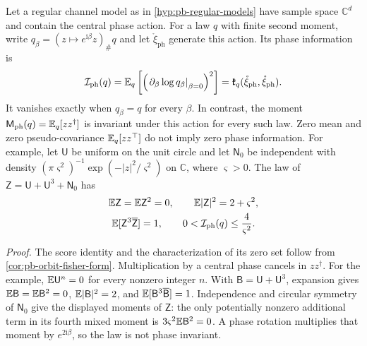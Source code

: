 Let a regular channel model as in \cref{hyp:pb-regular-models} have sample space
$\mathbb C^d$ and contain the central phase action. For a law $q$ with finite second
moment, write $q_\beta=(z\mapsto e^{\mathrm i\beta}z)_\#q$ and let
$\mathring\xi_{\mathrm{ph}}$ generate this action. Its phase information is
\begin{equation}
\mathcal I_{\mathrm{ph}}(q)
=\mathbb E_q\left[\left(\left.\partial_\beta\log q_\beta\right|_{\beta=0}\right)^2\right]
=\mathfrak k_q(\mathring\xi_{\mathrm{ph}},\mathring\xi_{\mathrm{ph}}).
\label{eq:pb-phase-information}
\end{equation}
It vanishes exactly when $q_\beta=q$ for every $\beta$. In contrast, the moment
$\mathsf M_{\mathrm{ph}}(q)=\mathbb E_q[zz^\dagger]$ is invariant under this action for every such law.
Zero mean and zero pseudo-covariance $\mathbb E_q[zz^\top]$ do not imply zero phase
information. For example, let $\mathsf U$ be uniform on the unit circle and let
$\mathsf N_0$ be independent with density
$(\pi\varsigma^2)^{-1}\exp(-|z|^2/\varsigma^2)$ on $\mathbb C$, where
$\varsigma>0$. The law of $\mathsf Z=\mathsf U+\mathsf U^3+\mathsf N_0$ has
\begin{equation}
\begin{gathered}
\mathbb E\mathsf Z=\mathbb E\mathsf Z^2=0,\qquad
\mathbb E|\mathsf Z|^2=2+\varsigma^2,\\
\mathbb E[\mathsf Z^3\overline{\mathsf Z}]=1,\qquad
0<\mathcal I_{\mathrm{ph}}(q)\leq\frac{4}{\varsigma^2}.
\end{gathered}
\label{eq:pb-phase-visible-example}
\end{equation}

\noindent\emph{Proof.}
The score identity and the characterization of its zero set follow from
\cref{cor:pb-orbit-fisher-form}. Multiplication by a central phase cancels in
$zz^\dagger$. For the example, $\mathbb E\mathsf U^n=0$ for every nonzero integer $n$.
With $\mathsf B=\mathsf U+\mathsf U^3$, expansion gives
$\mathbb E\mathsf B=\mathbb E\mathsf B^2=0$, $\mathbb E|\mathsf B|^2=2$, and
$\mathbb E[\mathsf B^3\overline{\mathsf B}]=1$. Independence and circular symmetry of
$\mathsf N_0$ give the displayed moments of $\mathsf Z$: the only potentially
nonzero additional term in its fourth mixed moment is
$3\varsigma^2\mathbb E\mathsf B^2=0$. A phase rotation multiplies that moment by
$e^{2\mathrm i\beta}$, so the law is not phase invariant.

